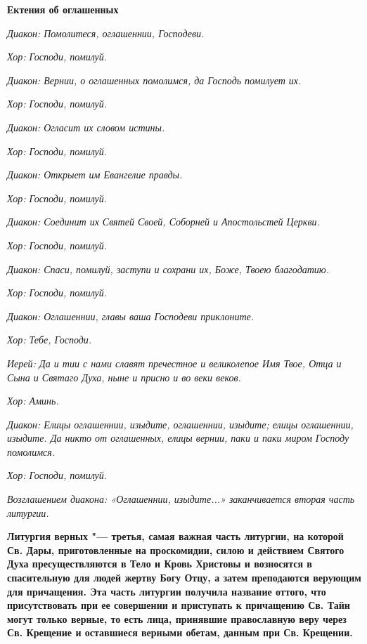 \bfseries Ектения об оглашенных\normalfont{}


\itshape Диакон:\normalfont{} Помолитеся, оглашеннии, Господеви.


\itshape Хор:\normalfont{} Господи, помилуй.


\itshape Диакон:\normalfont{} Вернии, о оглашенных помолимся, да Господь помилует их.


\itshape Хор:\normalfont{} Господи, помилуй.


\itshape Диакон:\normalfont{} Огласит их словом истины.


\itshape Хор:\normalfont{} Господи, помилуй.


\itshape Диакон:\normalfont{} Открыет им Евангелие правды.


\itshape Хор:\normalfont{} Господи, помилуй.


\itshape Диакон:\normalfont{} Соединит их Святей Своей, Соборней и Апостольстей Церкви.


\itshape Хор:\normalfont{} Господи, помилуй.


\itshape Диакон:\normalfont{} Спаси, помилуй, заступи и сохрани их, Боже, Твоею благодатию.


\itshape Хор:\normalfont{} Господи, помилуй.


\itshape Диакон:\normalfont{} Оглашеннии, главы ваша Господеви приклоните.


\itshape Хор:\normalfont{} Тебе, Господи.


\itshape Иерей:\normalfont{} Да и тии с нами славят пречестное и великолепое Имя Твое, Отца и Сына и Святаго Духа, ныне и присно и во веки веков.


\itshape Хор:\normalfont{} Аминь.


\itshape Диакон:\normalfont{} Елицы оглашеннии, изыдите, оглашеннии, изыдите; елицы оглашеннии, изыдите. Да никто от оглашенных, елицы вернии, паки и паки миром Господу помолимся.


\itshape Хор:\normalfont{} Господи, помилуй.


\itshape Возглашением диакона: «Оглашеннии, изыдите...» заканчивается вторая часть литургии.\normalfont{}

\mychapterending

 


\bfseries Литургия верных\normalfont{} "--- третья, самая важная часть литургии, на которой Св. Дары, приготовленные на проскомидии, силою и действием Святого Духа пресуществляются в Тело и Кровь Христовы и возносятся в спасительную для людей жертву Богу Отцу, а затем преподаются верующим для причащения. Эта часть литургии получила название оттого, что присутствовать при ее совершении и приступать к причащению Св. Тайн могут только верные, то есть лица, принявшие православную веру через Св. Крещение и оставшиеся верными обетам, данным при Св. Крещении.


